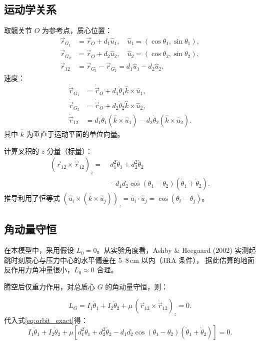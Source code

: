\documentclass{article}
\begin{document}
\subsection{运动学关系}
取髋关节 $O$ 为参考点，质心位置：
\begin{align}
\vec{r}_{G_1} &= \vec{r}_O + d_1 \hat{u}_1, \quad \hat{u}_1 = (\cos\theta_1,\sin\theta_1), \\
\vec{r}_{G_2} &= \vec{r}_O + d_2 \hat{u}_2, \quad \hat{u}_2 = (\cos\theta_2,\sin\theta_2), \\
\vec{r}_{12} &= \vec{r}_{G_1} - \vec{r}_{G_2} = d_1\hat{u}_1 - d_2\hat{u}_2.
\end{align}
速度：
\begin{align}
\dot{\vec{r}}_{G_1} &= \dot{\vec{r}}_O + d_1 \dot\theta_1 \hat{k} \times \hat{u}_1, \\
\dot{\vec{r}}_{G_2} &= \dot{\vec{r}}_O + d_2 \dot\theta_2 \hat{k} \times \hat{u}_2, \\
\dot{\vec{r}}_{12} &= d_1 \dot\theta_1 (\hat{k}\times\hat{u}_1) - d_2 \dot\theta_2 (\hat{k}\times\hat{u}_2).
\end{align}
其中 $\hat{k}$ 为垂直于运动平面的单位向量。

计算叉积的 $z$ 分量（标量）：
\begin{align}
(\vec{r}_{12} \times \dot{\vec{r}}_{12})_z = \;& d_1^2 \dot\theta_1 + d_2^2 \dot\theta_2 \nonumber \\
&- d_1 d_2 \cos(\theta_1-\theta_2) (\dot\theta_1 + \dot\theta_2). \label{eq:orbit_exact}
\end{align}
推导利用了恒等式 $(\hat{u}_i \times (\hat{k}\times\hat{u}_j))_z = \hat{u}_i\cdot\hat{u}_j = \cos(\theta_i-\theta_j)$。

\subsection{角动量守恒}
在本模型中，采用假设 $L_0 = 0$。从实验角度看，Ashby \& Heegaard (2002)
实测起跳时刻质心与压力中心的水平偏差在 5--8\,cm 以内（JRA 条件），
据此估算的地面反作用力角冲量很小，$L_0\approx 0$ 合理。

腾空后仅重力作用，对总质心 $G$ 的角动量守恒，则：

\[
L_G = I_1\dot\theta_1 + I_2\dot\theta_2 + \mu\,(\vec{r}_{12} \times \dot{\vec{r}}_{12})_z = 0.
\]
代入式\eqref{eq:orbit_exact}得：
\[
\boxed{I_1\dot\theta_1 + I_2\dot\theta_2 + \mu\left[ d_1^2 \dot\theta_1 + d_2^2 \dot\theta_2 - d_1 d_2 \cos(\theta_1-\theta_2) (\dot\theta_1 + \dot\theta_2) \right] = 0}. \label{eq:angular_momentum_exact}
\]
\end{document}
